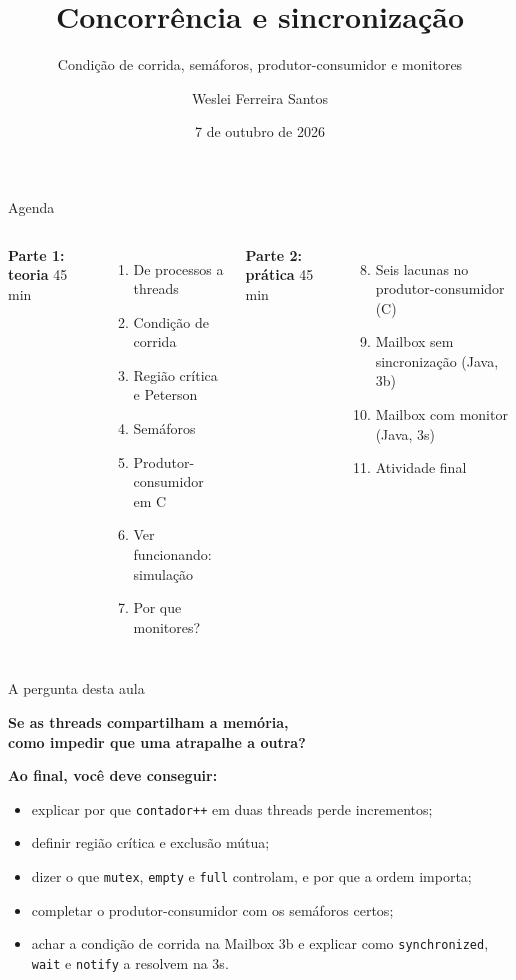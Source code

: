 \documentclass[aspectratio=169]{beamer}
\title{Concorrência e sincronização}
\subtitle{Condição de corrida, semáforos, produtor-consumidor e monitores}
\author{Weslei Ferreira Santos}
\institute{MATA58 · Sistemas Operacionais\\Instituto de Computação / UFBA}
\date{7 de outubro de 2026}
\begin{document}
\maketitle

\begin{frame}{Agenda}
\begin{columns}[T]
\textbf{Parte 1: teoria} \hfill {\small 45 min}
\begin{enumerate}
    \item De processos a threads
    \item Condição de corrida
    \item Região crítica e Peterson
    \item Semáforos
    \item Produtor-consumidor em C
    \item Ver funcionando: simulação
    \item Por que monitores?
\end{enumerate}

\textbf{Parte 2: prática} \hfill {\small 45 min}
\begin{enumerate}
    \setcounter{enumi}{7}
    \item Seis lacunas no produtor-consumidor (C)
    \item Mailbox sem sincronização (Java, 3b)
    \item Mailbox com monitor (Java, 3s)
    \item Atividade final
\end{enumerate}
\end{columns}
\end{frame}

\begin{frame}{A pergunta desta aula}
\begin{center}
{\Large \textbf{Se as threads compartilham a memória,\\[0.2em] como impedir que uma atrapalhe a outra?}}
\end{center}

\vspace{1em}
\textbf{Ao final, você deve conseguir:}
\begin{itemize}
    \item explicar por que \texttt{contador++} em duas threads perde incrementos;
    \item definir região crítica e exclusão mútua;
    \item dizer o que \texttt{mutex}, \texttt{empty} e \texttt{full} controlam, e por que a ordem importa;
    \item completar o produtor-consumidor com os semáforos certos;
    \item achar a condição de corrida na Mailbox 3b e explicar como \texttt{synchronized}, \texttt{wait} e \texttt{notify} a resolvem na 3s.
\end{itemize}
\end{frame}
\end{document}
